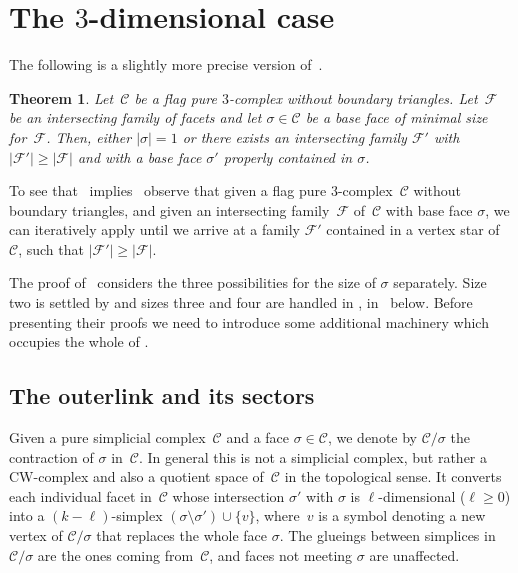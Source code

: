 \documentclass[a4paper,12pt]{amsart}
\theoremstyle{plain}
\newtheorem{theorem}{Theorem}[section]
\theoremstyle{definition}
\newcommand{\C}{\mathcal C}
\newcommand{\family}{\mathcal F}
\newcommand{\face}{\sigma}
\begin{document}
\section{The $3$-dimensional case}
\label{sec:three}

The following is a slightly more precise version of~. 

\begin{theorem}
\label{theorem:3dim}
  Let~$\C$ be a flag pure $3$-complex without boundary triangles.
  Let~$\family$ be an intersecting family of facets and let $\face\in \C$ be a base face of minimal size for~$\family$.
  Then, either $|\face|=1$ or there exists an intersecting family $\family'$ with $|\family'| \ge |\family|$ and with a base face $\face'$ properly contained in $\face$.
\end{theorem}

To see that~ implies~ observe that 
given a flag pure $3$-complex~$\C$ without boundary triangles, and given an intersecting family~$\family$ of~$\C$ with base face $\face$, we can iteratively apply  until we arrive at a family $\family'$ contained in a vertex star of~$\C$, such that $|\family'|  \geq |  \family|$.

The proof of~ considers the three possibilities for the size of $\face$ separately. Size two is settled by  and sizes three and four are handled in , in~ below. 
Before presenting their proofs we need to introduce some additional machinery which occupies the whole of . 

\subsection{The outerlink and its sectors}
\label{ssec:sectors}

Given a pure simplicial complex~$\C$ and a face $\face \in \C$, we denote by $\C/\face$ the contraction of $\face$ in~$\C$. In general this is not a simplicial complex, but rather a CW-complex  and also a quotient space of~$\C$ in the topological sense. It converts each individual facet in~$\C$ whose intersection $\face' $ with $\face$ is $\ell$-dimensional ($\ell\ge 0$)  into a $(k-\ell)$-simplex $(\face \setminus \face') \cup \{ v\}$, where~$v$ is a symbol denoting a new vertex of $\C/\face$ that replaces the whole face $\face$.
The glueings between simplices in $\C / \face$ are the ones coming from~$\C$, and faces not meeting $\face$ are unaffected.
\end{document}
